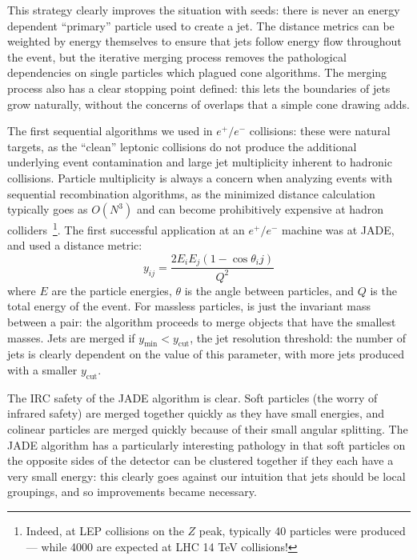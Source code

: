 This strategy clearly improves the situation with seeds: there is never an energy dependent ``primary'' particle used to create a jet. The distance metrics can be weighted by energy themselves to ensure that jets follow energy flow throughout the event, but the iterative merging process removes the pathological dependencies on single particles which plagued cone algorithms. The merging process also has a clear stopping point defined: this lets the boundaries of jets grow naturally, without the concerns of overlaps that a simple cone drawing adds.


The first sequential algorithms we used in $e^+/e^-$ collisions: these were natural targets, as the ``clean'' leptonic collisions do not produce the additional underlying event contamination and large jet multiplicity inherent to hadronic collisions. Particle multiplicity is always a concern when analyzing events with sequential recombination algorithms, as the minimized distance calculation typically goes as $O(N^3)$ and can become prohibitively expensive at hadron colliders~\cite{Jetography}\footnote{Indeed, at LEP collisions on the $Z$ peak, typically 40 particles were produced--- while 4000 are expected at LHC 14 TeV collisions!}. The first successful application at an $e^+/e^-$ machine was at JADE, and used a distance metric:
%
\begin{equation}
y_{ij} = \frac{2 E_i E_j (1 - \cos \theta_ij)}{Q^2}
\end{equation}
%
where $E$ are the particle energies, $\theta$ is the angle between particles, and $Q$ is the total energy of the event\cite{Jetography}. For massless particles, is just the invariant mass between a pair: the algorithm proceeds to merge objects that have the smallest masses. Jets are merged if $y_\mathrm{min} < y_\mathrm{cut}$, the jet resolution threshold: the number of jets is clearly dependent on the value of this parameter, with more jets produced with a smaller $y_\mathrm{cut}$.

The IRC safety of the JADE algorithm is clear. Soft particles (the worry of infrared safety) are merged together quickly as they have small energies, and colinear particles are merged quickly because of their small angular splitting. The JADE algorithm has a particularly interesting pathology in that soft particles on the opposite sides of the detector can be clustered together if they each have a very small energy: this clearly goes against our intuition that jets should be local groupings, and so improvements became necessary.

